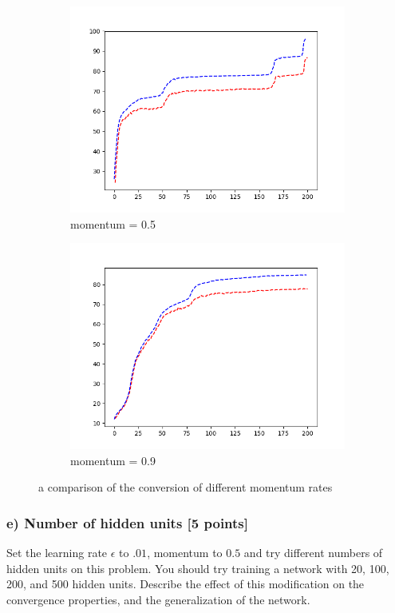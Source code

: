 \documentclass{article}
\begin{document}
\begin{figure}[h]
\centering
\begin{subfigure}{.5\textwidth}
  \centering
  \includegraphics[width=.8\linewidth]{m5ac.png}
  \caption{momentum = 0.5}
  \label{fig:sub1}
\end{subfigure}%
\begin{subfigure}{.5\textwidth}
  \centering
  \includegraphics[width=.8\linewidth]{m9ac.png}
  \caption{momentum = 0.9}
  \label{fig:sub2}
\end{subfigure}
\caption{a comparison of the conversion of different momentum rates}
\label{fig:momentum}
\end{figure}

\subsubsection*{e) Number of hidden units [5 points]}
Set the learning rate $\epsilon$ to $.01$, momentum to $0.5$ and try different numbers of
hidden units on this problem.
You should try training a network with 20, 100, 200, and 500  hidden units.
Describe the effect of this modification on the convergence properties, and the
generalization of the network.
\end{document}
